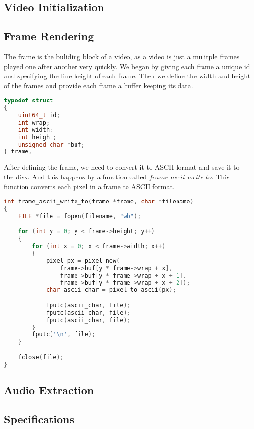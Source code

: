 \documentclass[a4paper,12pt]{article}
\begin{document}
\subsection{Video Initialization}

\subsection{Frame Rendering}

The frame is the buliding block of a video, as a video is just a mulitple frames played one after another very quickly.
We began by giving each frame a unique id and specifying the line height of each frame. Then we define the width and height of the frames and provide each frame a buffer keeping its data.

\newpage

\begin{lstlisting}[language=c]
typedef struct
{
    uint64_t id;
    int wrap;
    int width;
    int height;
    unsigned char *buf;
} frame;
\end{lstlisting}

After defining the frame, we need to convert it to ASCII format and save it to the disk. And this happens by a function called $frame\_ascii\_write\_to$. This function converts each pixel in a frame to ASCII format.

\begin{lstlisting}[language=c]
int frame_ascii_write_to(frame *frame, char *filename)
{
    FILE *file = fopen(filename, "wb");

    for (int y = 0; y < frame->height; y++)
    {
        for (int x = 0; x < frame->width; x++)
        {
            pixel px = pixel_new(
                frame->buf[y * frame->wrap + x],
                frame->buf[y * frame->wrap + x + 1],
                frame->buf[y * frame->wrap + x + 2]);
            char ascii_char = pixel_to_ascii(px);

            fputc(ascii_char, file);
            fputc(ascii_char, file);
            fputc(ascii_char, file);
        }
        fputc('\n', file);
    }

    fclose(file);
}
\end{lstlisting}
\subsection{Audio Extraction}

\subsection{Specifications}
\end{document}
